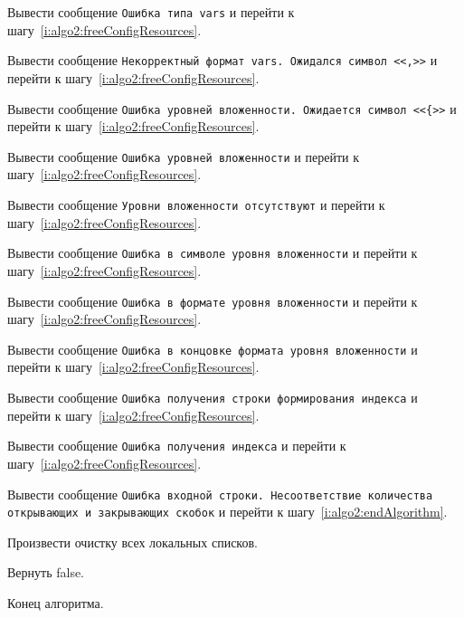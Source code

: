 \begin{enumerate_step}
    \item \label{i:algo2:errorVarsType} Вывести сообщение \texttt{Ошибка типа vars} и перейти к шагу~\ref{i:algo2:freeConfigResources}.
    \item \label{i:algo2:invalidVarsFormat} Вывести сообщение \texttt{Некорректный формат vars. Ожидался символ <<,>>} и перейти к шагу~\ref{i:algo2:freeConfigResources}.
    \item \label{i:algo2:nestingError1} Вывести сообщение \texttt{Ошибка уровней вложенности. Ожидается символ <<\{>>} и перейти к шагу~\ref{i:algo2:freeConfigResources}.
    \item \label{i:algo2:nestingError2} Вывести сообщение \texttt{Ошибка уровней вложенности} и перейти к шагу~\ref{i:algo2:freeConfigResources}.
    \item \label{i:algo2:notNesting} Вывести сообщение \texttt{Уровни вложенности отсутствуют} и перейти к шагу~\ref{i:algo2:freeConfigResources}.
    \item \label{i:algo2:nestingError3} Вывести сообщение \texttt{Ошибка в символе уровня вложенности} и перейти к шагу~\ref{i:algo2:freeConfigResources}.
    \item \label{i:algo2:nestingError4} Вывести сообщение \texttt{Ошибка в формате уровня вложенности} и перейти к шагу~\ref{i:algo2:freeConfigResources}.
    \item \label{i:algo2:nestingError5} Вывести сообщение \texttt{Ошибка в концовке формата уровня вложенности} и перейти к шагу~\ref{i:algo2:freeConfigResources}.
    \item \label{i:algo2:errorIdx} Вывести сообщение \texttt{Ошибка получения строки формирования индекса} и перейти к шагу~\ref{i:algo2:freeConfigResources}.
    \item \label{i:algo2:errorIdx1} Вывести сообщение \texttt{Ошибка получения индекса} и перейти к шагу~\ref{i:algo2:freeConfigResources}.
    \item \label{i:algo2:lastError} Вывести сообщение \texttt{Ошибка входной строки. Несоответствие количества открывающих и закрывающих скобок} и перейти к шагу~\ref{i:algo2:endAlgorithm}.

    \item \label{i:algo2:freeConfigResources} Произвести очистку всех локальных списков.
    \item \label{i:algo2:endAlgorithm} Вернуть false.
    \item \label{i:algo2:end} Конец алгоритма.
\end{enumerate_step}

